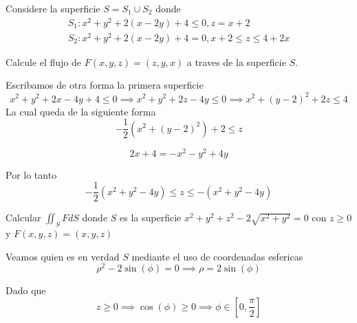 \message{ !name(MAT024.tex)}\documentclass[../main.tex]{subfiles}
\begin{document}
\begin{problem}
  Considere la superficie $S = S_{1} \cup S_{2}$ donde
  \begin{gather*}
    S_{1} : x^{2} + y^{2} + 2(x - 2y) + 4 \leq 0, z = x + 2\\
    S_{2} : x^{2} + y^{2} + 2(x - 2y) + 4 = 0, x + 2 \leq z \leq 4 + 2x
  \end{gather*}

  Calcule el flujo de $F(x, y, z) = (z, y, x)$ a traves de la superficie $S$.
\end{problem}
\begin{solution}
  Escribamos de otra forma la primera superficie
  \begin{equation*}
    x^{2} + y^{2} + 2x - 4y + 4 \leq 0 \implies x^{2} + y^{2} + 2z - 4y \leq 0 \implies x^{2} + (y - 2)^{2} + 2z \leq 4
  \end{equation*}
  La cual queda de la siguiente forma
  \begin{equation*}
    -\frac{1}{2}(x^{2} + (y - 2)^{2}) + 2 \leq z
  \end{equation*}

  \begin{equation*}
    2x + 4 = -x^{2} -y^{2} + 4y
  \end{equation*}

  Por lo tanto
  \begin{equation*}
    -\frac{1}{2}(x^{2} + y^{2} - 4y) \leq z \leq -(x^{2} + y^{2} - 4y)
  \end{equation*}
\end{solution}

\begin{problem}
  Calcular $\iint_{S} F dS$ donde $S$ es la superficie $x^{2} + y^{2} + z^{2} - 2\sqrt{x^{2} + y^{2}} = 0$ con $z \geq 0$ y $F(x, y, z) = (x, y, z)$
\end{problem}
\begin{solution}
  Veamos quien es en verdad $S$ mediante el uso de coordenadas esfericas
  \begin{equation*}
    \rho^{2} - 2\sin(\phi) = 0 \implies \rho = 2 \sin(\phi)
  \end{equation*}

  Dado que
  \begin{equation*}
    z \geq 0 \implies \cos(\phi) \geq 0 \implies \phi \in [0, \frac{\pi}{2}]
  \end{equation*}
\end{solution}
\end{document}
